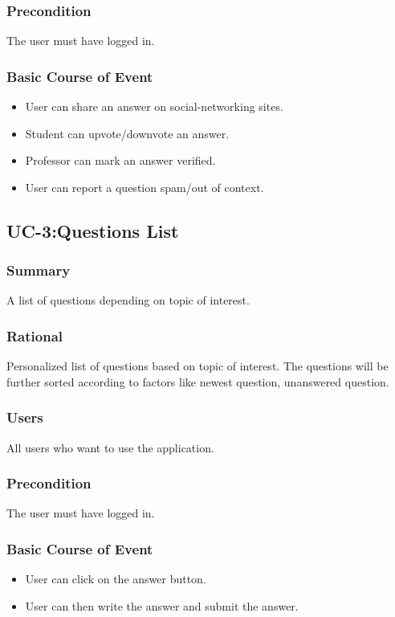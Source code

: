 \documentclass[journal,12pt,onecolumn,draftclsnofoot,]{IEEEtran}
\begin{document}
\subsubsection{Precondition}
The user must have logged in.
\subsubsection{Basic Course of Event}
\begin{itemize}
\item User can share an answer on social-networking sites.
\item Student can upvote/downvote an answer.
\item Professor can mark an answer verified.
\item User can report a question spam/out of context.
\end{itemize}

\subsection{UC-3:Questions List}
\subsubsection{Summary}
A list of questions depending on topic of interest.
\subsubsection{Rational}
Personalized list of questions based on topic of interest. The questions will be further sorted according to factors like newest question, unanswered question.
\subsubsection{Users}
All users who want to use the application.
\subsubsection{Precondition}
The user must have logged in.
\subsubsection{Basic Course of Event}
\begin{itemize}
\item User can click on the answer button.
\item User can then write the answer and submit the answer.
\end{itemize}
\end{document}
